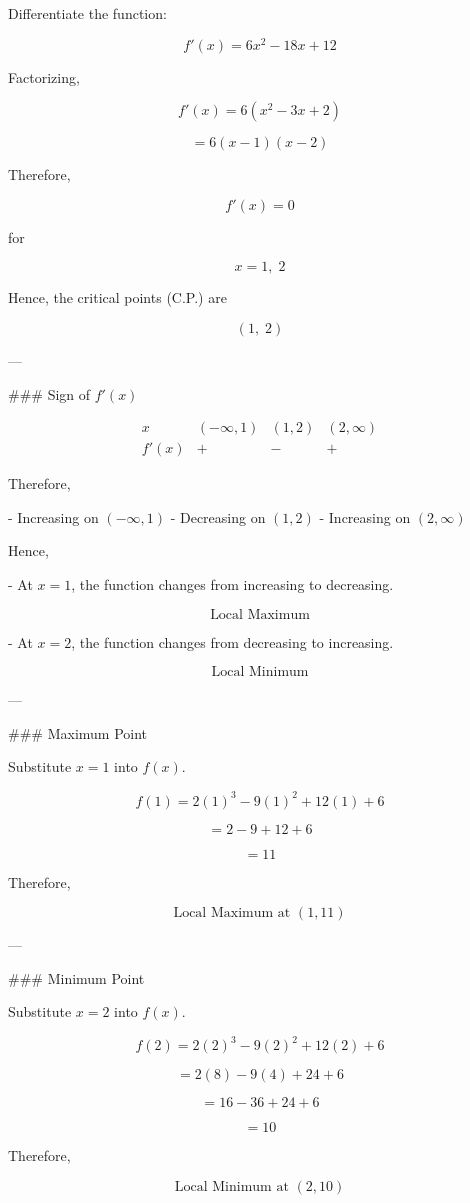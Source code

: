 \documentclass{article}
\begin{document}
Differentiate the function:

\[
f'(x)=6x^2-18x+12
\]

Factorizing,

\[
f'(x)=6(x^2-3x+2)
\]

\[
=6(x-1)(x-2)
\]

Therefore,

\[
f'(x)=0
\]

for

\[
x=1,\;2
\]

Hence, the critical points (C.P.) are

\[
(1,\;2)
\]

---

### Sign of $f'(x)$

\[
\begin{array}{c|ccc}
x & (-\infty,1) & (1,2) & (2,\infty)\\
\hline
f'(x) & + & - & +
\end{array}
\]

Therefore,

- Increasing on $(-\infty,1)$
- Decreasing on $(1,2)$
- Increasing on $(2,\infty)$

Hence,

- At $x=1$, the function changes from increasing to decreasing.

\[
\boxed{\text{Local Maximum}}
\]

- At $x=2$, the function changes from decreasing to increasing.

\[
\boxed{\text{Local Minimum}}
\]

---

### Maximum Point

Substitute $x=1$ into $f(x)$.

\[
f(1)=2(1)^3-9(1)^2+12(1)+6
\]

\[
=2-9+12+6
\]

\[
=11
\]

Therefore,

\[
\boxed{\text{Local Maximum at }(1,11)}
\]

---

### Minimum Point

Substitute $x=2$ into $f(x)$.

\[
f(2)=2(2)^3-9(2)^2+12(2)+6
\]

\[
=2(8)-9(4)+24+6
\]

\[
=16-36+24+6
\]

\[
=10
\]

Therefore,

\[
\boxed{\text{Local Minimum at }(2,10)}
\]
\end{document}
